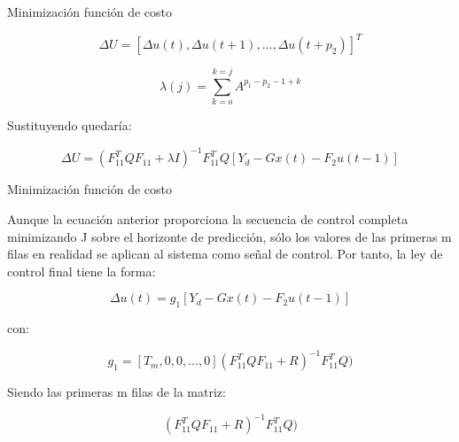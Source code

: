 \documentclass{beamer}
\begin{document}
\begin{frame}{Minimización función de costo}
\begin{justify}
\footnotesize{
$$\Delta U = [\Delta u(t),  \Delta u(t+1), ... , \Delta u(t+p_2)]^T$$

\vspace{0.2cm}

\vspace{0.2cm}
$$\lambda (j) =\sum_{k=o}^{k=j} A^{p_1-p_2-1+k}$$

Sustituyendo quedaría:

$$ \Delta U = (F_{11}^T Q F_{11}+\lambda I)^{-1}F_{11}^T Q  \left [ Y_d-Gx(t)-F_2 u (t-1)  \right ] $$
}
\end{justify}
\end{frame}


\begin{frame}{Minimización función de costo}
\begin{justify}
\footnotesize{
Aunque la ecuación anterior proporciona la secuencia de control completa minimizando J sobre el horizonte de predicción, sólo los valores de las primeras m filas en realidad se aplican al sistema como señal de control. Por tanto, la ley de control final tiene la forma:


 $$\Delta u(t)=g_1 \left [ Y_d- Gx(t)-F_2 u(t-1) \right ]$$
 
 con:

 $$g_1=\left [T_m, 0, 0, ..., 0  \right ](F_{11}^T Q F_{11}+R)^{-1} F_{11}^T Q)$$

\vspace{0.2cm}
 Siendo las primeras m filas de la matriz:


 $$(F_{11}^T Q F_{11}+R)^{-1} F_{11}^T Q)$$
}
\end{justify}
\end{frame}
\end{document}
